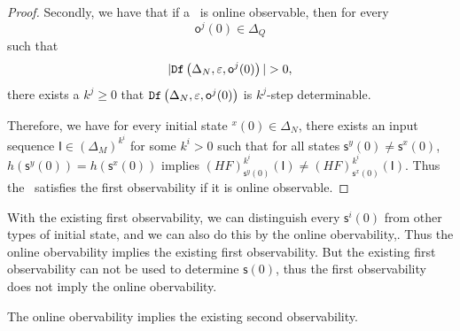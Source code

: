 \begin{proof}
Secondly, we have that if a \BCN\ is online observable,
then for every  \[\mathsf{o}^{j}(0)\in \Delta_Q\] such that \[|\Ded\left(\Delta_N,\varepsilon, \mathsf{o}^{j}(0)\right)|> 0,\] there exists a $k^{j}\ge0$ that ${\tt Df}\left(\Delta_N,\varepsilon,\mathsf{o}^{j}(0)\right)$ is $k^{j}$-step determinable. 

Therefore, we have for every initial state \State$^{x}(0)$$\in \Delta_N$, there exists an input sequence $\mathsf{I}\in(\Delta_M)^{k^i}$ for some $k^i >0$ such that for all states $\mathsf{s}^{y}(0)\neq \mathsf{s}^{x}(0)$, $h(\mathsf{s}^{y}(0))=h(\mathsf{s}^{x}(0))$ implies $(HF)^{k^i}_{\mathsf{s}^{y}(0)}(\mathsf{I})\neq (HF)^{k^i}_{{\mathsf{s}^{x}(0)}}(\mathsf{I})$. Thus the \BCN\ satisfies the first observability if it is online observable.

\end{proof}

With the existing first observability, we can distinguish every $\mathsf{s}^{i}(0)$ from other types of initial state,  and we can also do this by the online obervability,. Thus the online obervability implies the existing first observability. But the existing first observability can not be used to determine $\mathsf{s}(0)$, thus the first observability does not imply the online obervability.

\begin{theorem}
The online obervability implies the existing second observability.%
\label{theo:4}
\end{theorem}

